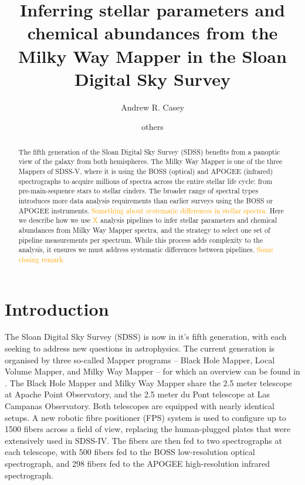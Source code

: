 \documentclass[modern]{aastex631}
\newcommand{\todo}[1]{\textcolor{orange}{#1}}
\begin{document}
\title{Inferring stellar parameters and chemical abundances from the Milky Way Mapper in the Sloan Digital Sky Survey}

\author[0000-0003-0174-0564]{Andrew R. Casey}

\author{others}


\begin{abstract}
\noindent The fifth generation of the Sloan Digital Sky Survey (SDSS) benefits from a panoptic view of the galaxy from both hemispheres.
The Milky Way Mapper is one of the three Mappers of SDSS-V, where it is using the BOSS (optical) and APOGEE (infrared) spectrographs to acquire millions of spectra across the entire stellar life cycle: from pre-main-sequence stars to stellar cinders.
The broader range of spectral types introduces more data analysis requirements than earlier surveys using the BOSS or APOGEE instruments.
\todo{Something about systematic differences in stellar spectra.}
Here we describe how we use \todo{X} analysis pipelines to infer stellar parameters and chemical abundances from Milky Way Mapper spectra, and the strategy to select one set of pipeline measurements per spectrum.
While this process adds complexity to the analysis, it ensures we must address systematic differences between pipelines.
\todo{Some closing remark.}
\end{abstract}



\section*{}\clearpage
\section{Introduction} \label{sec:intro}
The Sloan Digital Sky Survey (SDSS) is now in it's fifth generation, with each seeking to address new questions in astrophysics.
The current generation is organised by three so-called Mapper programs -- Black Hole Mapper, Local Volume Mapper, and Milky Way Mapper -- for which an overview can be found in \citet{kollmeier}.
The Black Hole Mapper and Milky Way Mapper share the 2.5 meter telescope at Apache Point Observatory, and the 2.5 meter du Pont telescope at Las Campanas Observatory.
Both telescopes are equipped with nearly identical setups. A new robotic fibre positioner (FPS) system is used to configure up to 1500 fibers across a field of view, replacing the human-plugged plates that were extensively used in SDSS-IV.
The fibers are then fed to two spectrographs at each telescope, with 500 fibers fed to the BOSS low-resolution optical spectrograph, and 298 fibers fed to the APOGEE high-resolution infrared spectrograph.\\
\end{document}
